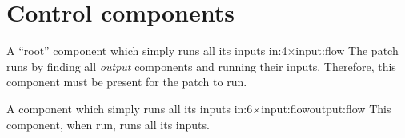 \section{Control components}
{A ``root'' component which simply runs all its inputs}
{in:4$\times$input:flow}{}
The patch runs by finding all \emph{output} components and running
their inputs. Therefore, this component must be present for the patch to run. 

{A component which simply runs all its inputs}
{in:6$\times$input:flow}{output:flow}
This component, when run, runs all its inputs.

